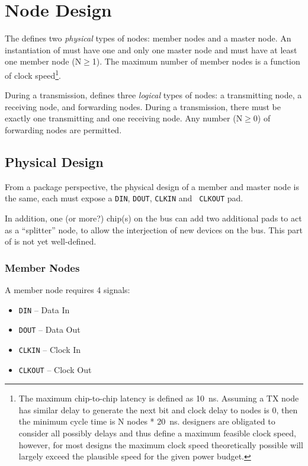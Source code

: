 \section{Node Design}
\label{sec:node}
The \bus defines two {\em physical} types of nodes: member nodes and a master
node. An instantiation of \bus must have one and only one master node and
must have at least one member node (N$\geq$1). The maximum number of member
nodes is a function of clock speed\footnote{
  The maximum chip-to-chip latency is defined as 10~ns. Assuming a TX node has
similar delay to generate the next bit and clock delay to nodes is 0, then the
minimum cycle time is N nodes * 20~ns. \bus designers are obligated to
consider all possibly delays and thus define a maximum feasible clock speed,
however, for most designs the maximum clock speed theoretically possible will
largely exceed the plausible speed for the given power budget.}.

During a transmission, \bus defines three {\em logical} types of nodes:
a transmitting node, a receiving node, and forwarding nodes. During a
transmission, there must be exactly one transmitting and one receiving node.
Any number (N$\geq$0) of forwarding nodes are permitted.

\subsection{Physical Design}
\label{sec:physical}

From a package perspective, the physical design of a member and master node
is the same, each must expose a {\tt DIN}, {\tt DOUT}, {\tt CLKIN} and {\tt
CLKOUT} pad.

In addition, one (or more?) chip(s) on the bus can add two additional pads to
act as a ``splitter'' node, to allow the interjection of new devices on the
bus. This part of \bus is not yet well-defined.

\subsubsection{Member Nodes}
\label{sec:physical-member}
A member node requires 4 signals:

\begin{itemize}
  \item {\tt DIN} -- Data In
  \item {\tt DOUT} -- Data Out
  \item {\tt CLKIN} -- Clock In
  \item {\tt CLKOUT} -- Clock Out
\end{itemize}

